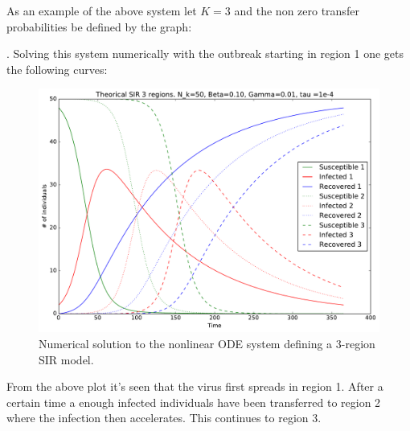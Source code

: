 As an example of the above system let $K=3$ and the non zero transfer probabilities be defined by the graph:
\begin{figure}[H]
	\centering
{}
\end{figure}
. Solving this system numerically with the outbreak starting in region 1 one gets the following curves:
\begin{figure}[H]
	\centering
	\includegraphics[width= 1.0 \linewidth]{plots/sir_three_region.pdf}
	\caption{Numerical solution to the nonlinear ODE system defining a 3-region SIR model.}
\end{figure}

From the above plot it's seen that the virus first spreads in region 1. After a certain time a enough infected individuals have been transferred to region 2 where the infection then accelerates. This continues to region 3.

\subsection{}
